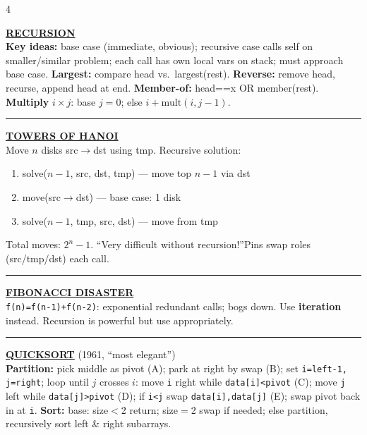 \documentclass[landscape,letterpaper]{article}
\newcommand{\h}[1]{\textbf{#1}}
\newcommand{\hd}[1]{\vspace{1pt}\noindent\textbf{\underline{#1}}\vspace{-1pt}}
\begin{document}
\begin{multicols}{4}

\hd{RECURSION}\\[-2pt]
\h{Key ideas:} base case (immediate, obvious); recursive case calls self on smaller/similar problem; each call has own local vars on stack; must approach base case. \h{Largest:} compare head vs.\ largest(rest). \h{Reverse:} remove head, recurse, append head at end. \h{Member-of:} head==x OR member(rest). \h{Multiply} $i{\times}j$: base $j{=}0$; else $i + \text{mult}(i,j{-}1)$.\\[-2pt]

\vspace{-1pt}\noindent\rule{\columnwidth}{0.2pt}\vspace{-3pt}

\hd{TOWERS OF HANOI}\\[-2pt]
Move $n$ disks src$\to$dst using tmp. Recursive solution:
\begin{enumerate}
  \item solve($n{-}1$, src, dst, tmp) — move top $n{-}1$ via dst
  \item move(src$\to$dst) — base case: 1 disk
  \item solve($n{-}1$, tmp, src, dst) — move from tmp
\end{enumerate}
Total moves: $2^n - 1$. ``Very difficult without recursion!''\quad Pins swap roles (src/tmp/dst) each call.\\[-2pt]

\vspace{-1pt}\noindent\rule{\columnwidth}{0.2pt}\vspace{-3pt}

\hd{FIBONACCI DISASTER}\\[-2pt]
\texttt{f(n)=f(n-1)+f(n-2)}: exponential redundant calls; bogs down. Use \h{iteration} instead. Recursion is powerful but use appropriately.\\[-2pt]

\vspace{-1pt}\noindent\rule{\columnwidth}{0.2pt}\vspace{-3pt}

\hd{QUICKSORT} (1961, ``most elegant'')\\[-2pt]
\h{Partition:} pick middle as pivot (A); park at right by swap (B); set \texttt{i=left-1, j=right}; loop until $j$ crosses $i$: move \texttt{i} right while \texttt{data[i]<pivot} (C); move \texttt{j} left while \texttt{data[j]>pivot} (D); if \texttt{i<j} swap \texttt{data[i],data[j]} (E); swap pivot back in at \texttt{i}. \h{Sort:} base: size$<$2 return; size$=$2 swap if needed; else partition, recursively sort left \& right subarrays.\\[-2pt]


\end{multicols}
\end{document}
